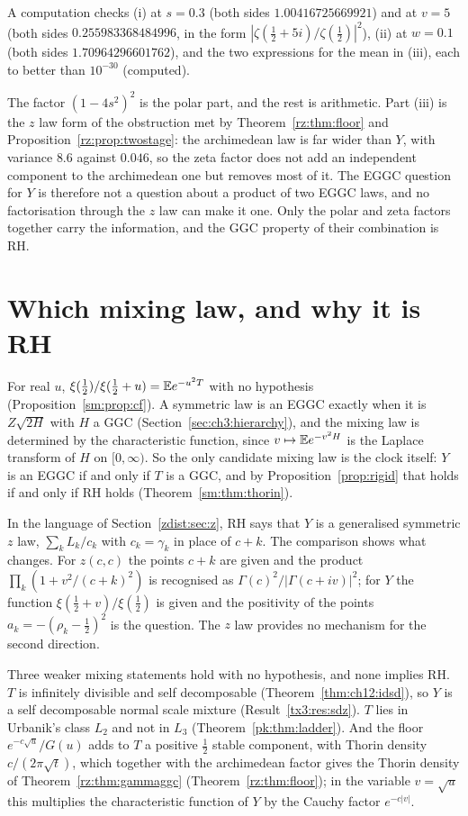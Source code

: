 A computation checks (i) at $s=0.3$ (both sides $1.00416725669921$) and at $v=5$ (both sides $0.255983368484996$, in the form $|\zeta(\frac12+5i)/\zeta(\frac12)|^2$), (ii) at $w=0.1$ (both sides $1.70964296601762$), and the two expressions for the mean in (iii), each to better than $10^{-30}$ (computed).

The factor $(1-4s^2)^2$ is the polar part, and the rest is arithmetic. Part (iii) is the $z$ law form of the obstruction met by Theorem~\ref{rz:thm:floor} and Proposition~\ref{rz:prop:twostage}: the archimedean law is far wider than $Y$, with variance $8.6$ against $0.046$, so the zeta factor does not add an independent component to the archimedean one but removes most of it. The EGGC question for $Y$ is therefore not a question about a product of two EGGC laws, and no factorisation through the $z$ law can make it one. Only the polar and zeta factors together carry the information, and the GGC property of their combination is RH.

\section{Which mixing law, and why it is RH}\label{zdist:sec:which}

For real $u$, $\xi(\frac12)/\xi(\frac12+u)=\mathbb{E} e^{-u^2T}$ with no hypothesis (Proposition~\ref{sm:prop:cf}). A symmetric law is an EGGC exactly when it is $Z\sqrt{2H}$ with $H$ a GGC (Section~\ref{sec:ch3:hierarchy}), and the mixing law is determined by the characteristic function, since $v\mapsto\mathbb{E} e^{-v^2H}$ is the Laplace transform of $H$ on $[0,\infty)$. So the only candidate mixing law is the clock itself: $Y$ is an EGGC if and only if $T$ is a GGC, and by Proposition~\ref{prop:rigid} that holds if and only if RH holds (Theorem~\ref{sm:thm:thorin}).

In the language of Section~\ref{zdist:sec:z}, RH says that $Y$ is a generalised symmetric $z$ law, $\sum_kL_k/c_k$ with $c_k=\gamma_k$ in place of $c+k$. The comparison shows what changes. For $z(c,c)$ the points $c+k$ are given and the product $\prod_k(1+v^2/(c+k)^2)$ is recognised as $\Gamma(c)^2/|\Gamma(c+iv)|^2$; for $Y$ the function $\xi(\frac12+v)/\xi(\frac12)$ is given and the positivity of the points $a_k=-(\rho_k-\frac12)^2$ is the question. The $z$ law provides no mechanism for the second direction.

\begin{remark}\label{zdist:rem:mixing}
Three weaker mixing statements hold with no hypothesis, and none implies RH. $T$ is infinitely divisible and self decomposable (Theorem~\ref{thm:ch12:idsd}), so $Y$ is a self decomposable normal scale mixture (Result~\ref{tx3:res:sdz}). $T$ lies in Urbanik's class $L_2$ and not in $L_3$ (Theorem~\ref{pk:thm:ladder}). And the floor $e^{-c\sqrt u}/G(u)$ adds to $T$ a positive $\frac12$ stable component, with Thorin density $c/(2\pi\sqrt t)$, which together with the archimedean factor gives the Thorin density of Theorem~\ref{rz:thm:gammaggc} (Theorem~\ref{rz:thm:floor}); in the variable $v=\sqrt u$ this multiplies the characteristic function of $Y$ by the Cauchy factor $e^{-c|v|}$.
\end{remark}

